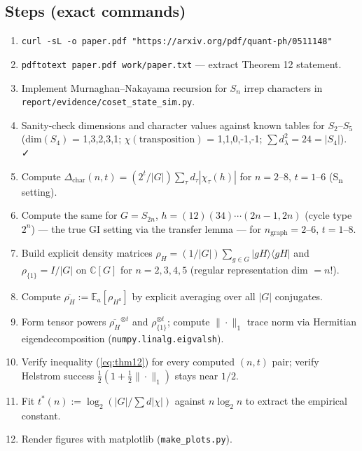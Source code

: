 \documentclass[11pt]{article}
\begin{document}
\subsection{Steps (exact commands)}
\begin{enumerate}
  \item \texttt{curl -sL -o paper.pdf "https://arxiv.org/pdf/quant-ph/0511148"}
  \item \texttt{pdftotext paper.pdf work/paper.txt} — extract Theorem 12 statement.
  \item Implement Murnaghan--Nakayama recursion for $S_n$ irrep
        characters in
        \texttt{report/evidence/coset\_state\_sim.py}.
  \item Sanity-check dimensions and character values against known
        tables for $S_2$--$S_5$
        (dim$(S_4)$ = 1,3,2,3,1; $\chi(\text{transposition})$ = 1,1,0,-1,-1;
        $\sum d_\lambda^2 = 24 = |S_4|$).  ✓
  \item Compute $\Delta_{\text{char}}(n,t) = (2^t/|G|) \sum_\tau
        d_\tau |\chi_\tau(h)|$ for $n = 2$--$8$, $t = 1$--$6$ (S\textsubscript{n} setting).
  \item Compute the same for $G = S_{2n}$, $h = (12)(34)\cdots(2n{-}1,2n)$
        (cycle type $2^n$) --- the true GI setting via the transfer lemma
        --- for $n_{\text{graph}} = 2$--$6$, $t = 1$--$8$.
  \item Build explicit density matrices $\rho_H = (1/|G|)\sum_{g\in G}
        |gH\rangle\langle gH|$ and
        $\rho_{\{1\}} = I/|G|$ on $\mathbb C[G]$ for $n = 2,3,4,5$
        (regular representation dim $= n!$).
  \item Compute $\overline{\rho_H} := \mathbb E_a[\rho_{H^a}]$ by
        explicit averaging over all $|G|$ conjugates.
  \item Form tensor powers $\overline{\rho_H}^{\otimes t}$ and
        $\rho_{\{1\}}^{\otimes t}$; compute $\|\cdot\|_1$ trace norm
        via Hermitian eigendecomposition
        (\texttt{numpy.linalg.eigvalsh}).
  \item Verify inequality (\ref{eq:thm12}) for every computed $(n,t)$
        pair; verify Helstrom success $\tfrac12(1 + \tfrac12\|\cdot\|_1)$
        stays near $1/2$.
  \item Fit $t^*(n) := \log_2(|G|/\sum d|\chi|)$ against $n \log_2 n$
        to extract the empirical constant.
  \item Render figures with matplotlib (\texttt{make\_plots.py}).
\end{enumerate}
\end{document}
